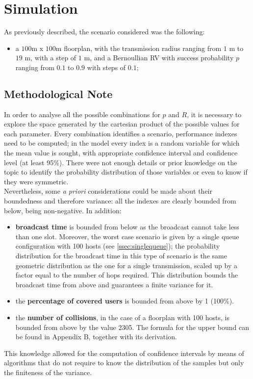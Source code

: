 %
\chapter{Simulation}\label{ch:simulation}
As previously described, the scenario considered was the following:
\begin{itemize}
    \item a $100$m x $100$m floorplan, with the transmission
    radius ranging from $1$ m to $19$ m, with a step of $1$ m, and a Bernoullian RV
    with success probability $p$ ranging from $0.1$ to $0.9$ with steps of $0.1$;
\end{itemize}
\section*{Methodological Note}\label{Methodological}
In order to analyse all the possible combinations for $p$ and $R$, it is necessary to explore the space
generated by the cartesian product of the possible values for each parameter. Every combination 
identifies a scenario, performance indexes need to be computed; in the model
every index is a random variable for which the mean value is sought, with appropriate confidence interval
and confidence level (at least 95\%). 
There were not enough details or prior knowledge on the topic to identify the probability distribution of those variables or even to know if they were symmetric.\\
Nevertheless, some \textit{a priori} considerations could be made about their boundedness and therefore variance: all the indexes are clearly bounded from below, being non-negative. In addition:
\begin{itemize}
    \item \textbf{broadcast time} is bounded from below as the broadcast cannot take less than one slot. Moreover, the worst case scenario is given by a single queue configuration with 100 hosts (see \ref{ssec:singlequeue}); the probability distribution for the broadcast time in this type of scenario is the same geometric distribution as the one for a single transmission, scaled up by a factor equal to the number of hops required. This distribution bounds the broadcast time from above and guarantees a finite variance for it.
    \item the \textbf{percentage of covered users} is bounded from above by 1 (100\%).
    \item the \textbf{number of collisions}, in the case of a floorplan with 100 hosts, is bounded from above by the value 2305. The formula for the upper bound can be found in Appendix B, together with its derivation.
\end{itemize} 
This knowledge allowed for the computation of confidence intervals by means of algorithms that do not require to know the distribution of the
samples but only the finiteness of the variance.

